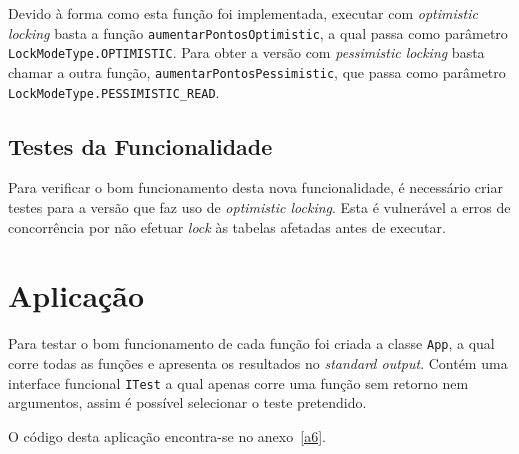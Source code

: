 Devido à forma como esta função foi implementada, executar com \textit{optimistic locking} basta a função \texttt{aumentarPontosOptimistic}, a qual passa como parâmetro
\texttt{LockModeType.OPTIMISTIC}. Para obter a versão com \textit{pessimistic locking} basta chamar a outra função, \texttt{aumentarPontosPessimistic}, que passa como
parâmetro \texttt{LockModeType.PESSIMISTIC\_READ}.

%
%
\subsection{Testes da Funcionalidade}\label{sec333}

Para verificar o bom funcionamento desta nova funcionalidade, é necessário criar testes para a versão que faz uso de \textit{optimistic locking}. Esta é
vulnerável a erros de concorrência por não efetuar \textit{lock} às tabelas afetadas antes de executar.

%
%
\section{Aplicação}\label{sec34}

Para testar o bom funcionamento de cada função foi criada a classe \texttt{App}, a qual corre todas as funções e apresenta os resultados no \textit{standard output}. Contém uma interface
funcional \texttt{ITest} a qual apenas corre uma função sem retorno nem argumentos, assim é possível selecionar o teste pretendido.

O código desta aplicação encontra-se no anexo~\ref{a6}.